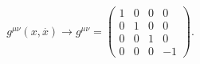 \begin{equation}
g^{\mu \nu }(x,\stackrel{.}{x})\rightarrow g^{\mu \nu }=\left( 
\begin{array}{llll}
1 & 0 & 0 & 0 \\ 
0 & 1 & 0 & 0 \\ 
0 & 0 & 1 & 0 \\ 
0 & 0 & 0 & -1
\end{array}
\right).
\end{equation}

